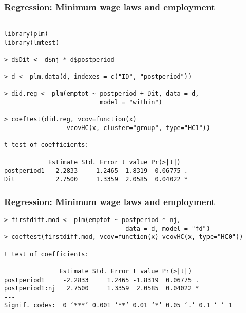 \documentclass{beamer}
\numberwithin{equation}{section}
\begin{document}
\begin{frame}[fragile]
  \frametitle{Regression: Minimum wage laws and employment}

\footnotesize
\begin{verbatim}

library(plm)
library(lmtest)

> d$Dit <- d$nj * d$postperiod

> d <- plm.data(d, indexes = c("ID", "postperiod"))

> did.reg <- plm(emptot ~ postperiod + Dit, data = d,
                          model = "within")

> coeftest(did.reg, vcov=function(x) 
                 vcovHC(x, cluster="group", type="HC1"))

t test of coefficients:

            Estimate Std. Error t value Pr(>|t|)  
postperiod1  -2.2833     1.2465 -1.8319  0.06775 .
Dit           2.7500     1.3359  2.0585  0.04022 *
\end{verbatim}

\end{frame}


%
%
%




\begin{frame}[fragile]
  \frametitle{Regression: Minimum wage laws and employment}
  \footnotesize
\begin{verbatim}
> firstdiff.mod <- plm(emptot ~ postperiod * nj, 
                                 data = d, model = "fd")
> coeftest(firstdiff.mod, vcov=function(x) vcovHC(x, type="HC0"))

t test of coefficients:

               Estimate Std. Error t value Pr(>|t|)  
postperiod1     -2.2833     1.2465 -1.8319  0.06775 .
postperiod1:nj   2.7500     1.3359  2.0585  0.04022 *
---
Signif. codes:  0 ‘***’ 0.001 ‘**’ 0.01 ‘*’ 0.05 ‘.’ 0.1 ‘ ’ 1 
\end{verbatim}
\end{frame}
\end{document}
